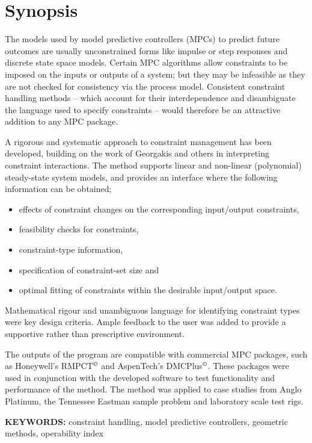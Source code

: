\chapter*{Synopsis}
The models used by model predictive controllers (MPCs) to predict future 
outcomes are usually unconstrained forms like impulse or step responses 
and discrete state space models. Certain MPC algorithms allow constraints
 to be imposed on the inputs or outputs of a system; but they may be 
infeasible as they are not checked for consistency via the process model.
 Consistent constraint handling methods -- which account for their 
interdependence and disambiguate the language used to specify constraints
 -- would therefore be an attractive addition to any MPC package.

A rigorous and systematic approach to constraint management has been 
developed, building on the work of Georgakis and others in interpreting 
constraint interactions. The method supports linear and non-linear 
(polynomial) steady-state system models, and provides an interface where 
the following information can be obtained;
\begin{itemize}
  \item effects of constraint changes on the corresponding input/output 
    constraints,
  \item feasibility checks for constraints,
  \item constraint-type information,
  \item specification of constraint-set size and
  \item optimal fitting of constraints within the desirable input/output 
    space.
\end{itemize}
Mathematical rigour and unambiguous language for identifying constraint 
types were key design criteria. Ample feedback to the user was added to 
provide a supportive rather than prescriptive environment.

The outputs of the program are compatible with commercial MPC packages, 
such as Honeywell’s RMPCT$^{\copyright}$ and AspenTech’s 
DMCPlus$^{\copyright}$. These packages were used in conjunction with the 
developed software to test functionality and performance of the method. 
The method was applied to case studies from Anglo Platinum, the Tennessee 
Eastman sample problem and laboratory scale test rigs.
\bigskip

\noindent \textbf{KEYWORDS:} constraint handling, model predictive
controllers, geometric methods, operability index


